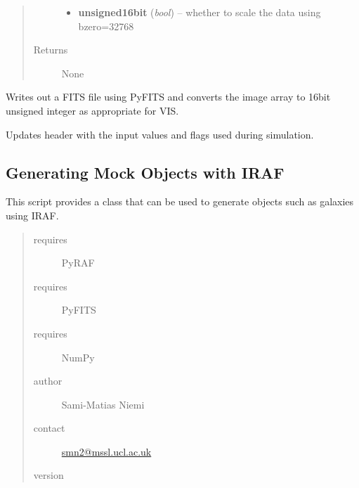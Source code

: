 \documentclass[a4paper,11pt,english]{sphinxmanual}
\begin{document}
\begin{fulllineitems}
\begin{fulllineitems}
\begin{quote}
\begin{description}
\begin{itemize}
\item {} 
\textbf{unsigned16bit} (\emph{bool}) -- whether to scale the data using bzero=32768

\end{itemize}

\item[{Returns}] \leavevmode
None

\end{description}\end{quote}

\end{fulllineitems}


\begin{fulllineitems}
\label{simulator:simulator.simulator.VISsimulator.writeOutputs}
Writes out a FITS file using PyFITS and converts the image array to 16bit unsigned integer as
appropriate for VIS.

Updates header with the input values and flags used during simulation.

\end{fulllineitems}


\end{fulllineitems}

\label{simulator:module-simulator.generateGalaxies}

\subsection{Generating Mock Objects with IRAF}
\label{simulator:generating-mock-objects-with-iraf}
This script provides a class that can be used to generate objects such as galaxies using IRAF.
\begin{quote}\begin{description}
\item[{requires}] \leavevmode
PyRAF

\item[{requires}] \leavevmode
PyFITS

\item[{requires}] \leavevmode
NumPy

\item[{author}] \leavevmode
Sami-Matias Niemi

\item[{contact}] \leavevmode
\href{mailto:smn2@mssl.ucl.ac.uk}{smn2@mssl.ucl.ac.uk}

\item[{version}] 

\end{description}\end{quote}
\end{document}
